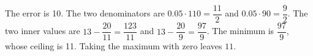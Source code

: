 The error is 10. The two denominators are $0.05\cdot110=\dfrac{11}{2}$ and $0.05\cdot90=\dfrac{9}{2}$. The two inner values are $13-\dfrac{20}{11}=\dfrac{123}{11}$ and $13-\dfrac{20}{9}=\dfrac{97}{9}$. The minimum is $\dfrac{97}{9}$, whose ceiling is 11. Taking the maximum with zero leaves $\boxed{11}$.
